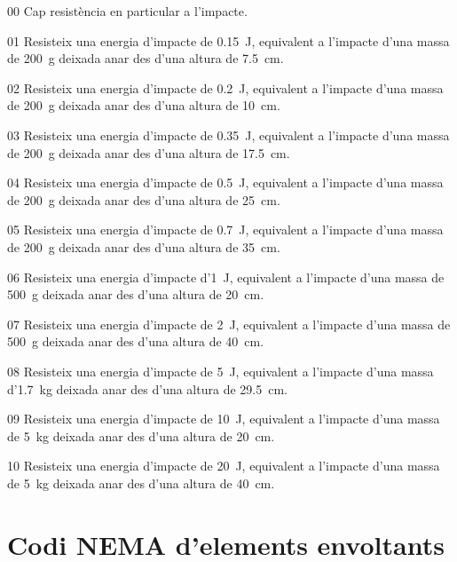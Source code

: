 \begin{list}{}
   {\setlength{\labelwidth}{10mm} \setlength{\leftmargin}{15mm} \setlength{\labelsep}{5mm}}
   \item[00] Cap resistència en particular a l'impacte.
   \item[01] Resisteix una energia d'impacte de \qty{0,15}{J}, equivalent a l'impacte d'una massa de \qty{200}{g} deixada anar des d'una altura de \qty{7,5}{cm}.
   \item[02] Resisteix una energia d'impacte de \qty{0,2}{J}, equivalent a l'impacte d'una massa de \qty{200}{g} deixada anar des d'una altura de \qty{10}{cm}.
   \item[03] Resisteix una energia d'impacte de \qty{0,35}{J}, equivalent a l'impacte d'una massa de \qty{200}{g} deixada anar des d'una altura de \qty{17,5}{cm}.
   \item[04] Resisteix una energia d'impacte de \qty{0,5}{J}, equivalent a l'impacte d'una massa de \qty{200}{g} deixada anar des d'una altura de \qty{25}{cm}.
   \item[05] Resisteix una energia d'impacte de \qty{0,7}{J}, equivalent a l'impacte d'una massa de \qty{200}{g} deixada anar des d'una altura de \qty{35}{cm}.
   \item[06]Resisteix una energia d'impacte d'\qty{1}{J}, equivalent a l'impacte d'una massa de \qty{500}{g} deixada anar des d'una altura de \qty{20}{cm}.
   \item[07]Resisteix una energia d'impacte de \qty{2}{J}, equivalent a l'impacte d'una massa de \qty{500}{g} deixada anar des d'una altura de \qty{40}{cm}.
   \item[08]Resisteix una energia d'impacte de \qty{5}{J}, equivalent a l'impacte d'una massa d'\qty{1,7}{kg} deixada anar des d'una altura de \qty{29,5}{cm}.
   \item[09]Resisteix una energia d'impacte de \qty{10}{J}, equivalent a l'impacte d'una massa de \qty{5}{kg} deixada anar des d'una altura de \qty{20}{cm}.
   \item[10]Resisteix una energia d'impacte de \qty{20}{J}, equivalent a l'impacte d'una massa de \qty{5}{kg} deixada anar des d'una altura de \qty{40}{cm}.
\end{list}



\section{Codi NEMA d'elements envoltants}
 

